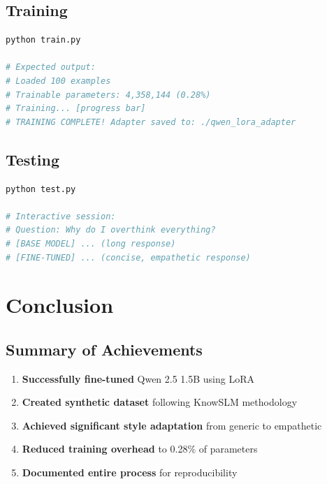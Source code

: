 \documentclass[12pt,a4paper]{article}
\begin{document}
\subsection{Training}

\begin{lstlisting}[language=bash, caption=Training Command]
python train.py

# Expected output:
# Loaded 100 examples
# Trainable parameters: 4,358,144 (0.28%)
# Training... [progress bar]
# TRAINING COMPLETE! Adapter saved to: ./qwen_lora_adapter
\end{lstlisting}

\subsection{Testing}

\begin{lstlisting}[language=bash, caption=Testing Command]
python test.py

# Interactive session:
# Question: Why do I overthink everything?
# [BASE MODEL] ... (long response)
# [FINE-TUNED] ... (concise, empathetic response)
\end{lstlisting}

\section{Conclusion}

\subsection{Summary of Achievements}

\begin{enumerate}
    \item \textbf{Successfully fine-tuned} Qwen 2.5 1.5B using LoRA
    \item \textbf{Created synthetic dataset} following KnowSLM methodology
    \item \textbf{Achieved significant style adaptation} from generic to empathetic
    \item \textbf{Reduced training overhead} to 0.28\% of parameters
    \item \textbf{Documented entire process} for reproducibility
\end{enumerate}
\end{document}
